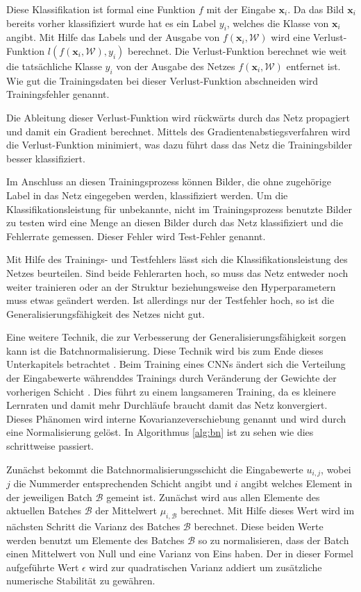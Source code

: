 Diese Klassifikation ist formal eine Funktion $f$ mit der Eingabe $\mathbf{x}_i$. Da das Bild $\mathbf{x}_i$ bereits vorher klassifiziert wurde hat es ein Label $y_i$, welches die Klasse von $\mathbf{x}_i$ angibt. Mit Hilfe das Labels und der Ausgabe von $f(\mathbf{x}_i, \mathcal{W})$ wird eine Verlust-Funktion $l(f(\mathbf{x}_i,\mathcal{W}),y_i)$ berechnet. Die Verlust-Funktion berechnet wie weit die tatsächliche Klasse $y_i$ von der Ausgabe des Netzes $f(\mathbf{x}_i, \mathcal{W})$ entfernet ist. Wie gut die Trainingsdaten bei dieser Verlust-Funktion abschneiden wird Trainingsfehler genannt.


Die Ableitung dieser Verlust-Funktion wird rückwärts durch das Netz propagiert und damit ein Gradient berechnet. Mittels des Gradientenabstiegsverfahren wird die Verlust-Funktion minimiert, was dazu führt dass das Netz die Trainingsbilder besser klassifiziert. 


Im Anschluss an diesen Trainingsprozess können Bilder, die ohne zugehörige Label in das Netz eingegeben werden, klassifiziert werden. Um die Klassifikationsleistung für unbekannte, nicht im Trainingsprozess benutzte Bilder zu testen wird eine Menge an diesen Bilder durch das Netz klassifiziert und die Fehlerrate gemessen. Dieser Fehler wird Test-Fehler genannt. 


Mit Hilfe des Trainings- und Testfehlers lässt sich die Klassifikationsleistung des Netzes beurteilen. Sind beide Fehlerarten hoch, so muss das Netz entweder noch weiter trainieren oder an der Struktur beziehungsweise den Hyperparametern muss etwas geändert werden. Ist allerdings nur der Testfehler hoch, so ist die Generalisierungsfähigkeit des Netzes nicht gut. 

Eine weitere Technik, die zur Verbesserung der Generalisierungsfähigkeit sorgen kann ist die Batchnormalisierung. Diese Technik wird bis zum Ende dieses Unterkapitels betrachtet \cite{batchnorm}. Beim Training eines CNNs ändert sich die Verteilung der Eingabewerte währenddes Trainings durch Veränderung der Gewichte der vorherigen Schicht . Dies führt zu einem langsameren Training, da es kleinere Lernraten und damit mehr Durchläufe braucht damit das Netz konvergiert. Dieses Phänomen wird interne Kovarianzeverschiebung genannt und wird durch eine Normalisierung gelöst. In Algorithmus \ref{alg:bn} ist zu sehen wie dies schrittweise passiert.


Zunächst bekommt die Batchnormalisierungsschicht die Eingabewerte $u_{i,j}$, wobei $j$ die Nummerder entsprechenden Schicht angibt und $i$ angibt welches Element in der jeweiligen Batch $\mathcal{B}$ gemeint ist. Zunächst wird aus allen Elemente des aktuellen Batches $\mathcal{B}$ der Mittelwert $\mu_{i,\mathcal{B}}$ berechnet. Mit Hilfe dieses Wert wird im nächsten Schritt die Varianz des Batches $\mathcal{B}$ berechnet. Diese beiden Werte werden benutzt um Elemente des Batches $\mathcal{B}$ so zu normalisieren, dass der Batch einen Mittelwert von Null und eine Varianz von Eins haben. Der in dieser Formel aufgeführte Wert $\epsilon$ wird zur quadratischen Varianz addiert um zusätzliche numerische Stabilität zu gewähren. 


